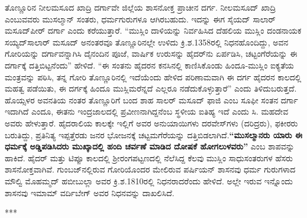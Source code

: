 \vskip -2pt

ತೊಣ್ಣೂರಿನ ನೀಲಮಸೂದ ಖಾದ್ರಿ ದರ್ಗಾವೇ ಜಿಲ್ಲೆಯ ಶಾಸನೋಕ್ತ ಪ್ರಾಚೀನ ದರ್ಗ. ನೀಲಮಸೂದ್​ ಖಾದ್ರಿ ಎಂಬುವವರು ಮುಸಲ್ಮಾನ್​ ಸಂತರು, ಧರ್ಮಗುರುಗಳೂ ಆಗಿರಬಹುದು. ಇದನ್ನು ಈಗ ಸೈಯದ್​ ಸಾಲಾರ್​ ಮಸೂದ್​ ಪೀರ್​ ದರ್ಗಾ ಎಂದು ಕರೆಯುತ್ತಾರೆ. “ಮುಸ್ಲಿಂ ದಾಳಿಯನ್ನು ನಿರ್ವಹಿಸಿದ ದೆಹಲಿಯ ಮುಸ್ಲಿಂ ದಂಡನಾಯಕ ಸಯ್ಯದ್​ ಸಾಲಾರ್​ ಮಸೂದ್​ ಅನಂತರವೂ ತೊಣ್ಣೂರಿನಲ್ಲೇ ಉಳಿದು ಕ್ರಿ.ಶ.1358ರಲ್ಲಿ ನಿಧನಹೊಂದಿದ್ದು, ಅವನ ಗೋರಿಯನ್ನು ದರ್ಗಾವನ್ನಾಗಿಸಿ ದೈನಂದಿನ ಪೂಜೆ, ವಾರ್ಷಿಕ ಉರುಸನ್ನು ಹೈದರ್​ನು ಏರ್ಪಡಿಸಿ, ಚಟ್ಟಂಗೆರೆಯನ್ನು ಈ ದರ್ಗಾಕ್ಕೆ ದತ್ತಿಬಿಟ್ಟನೆಂದು” ಹೇಳಿದೆ. “ಈ ಸಂತನು ಹೈದರನ ಕನಸಿನಲ್ಲಿ ಕಾಣಿಸಿಕೊಂಡು ಹಿಂದೂ-ಮುಸ್ಲಿಂ ಐಕ್ಯತೆಯ ಮಂತ್ರವನ್ನು ಪಠಿಸಿ, ತನ್ನ ಗೋರಿ ತೊಣ್ಣೂರಿನಲ್ಲಿ ಇದೆಯೆಂದು ಹೇಳಿದ ಪರಿಣಾಮವಾಗಿ ಈ ದರ್ಗ ಹೈದರನ ಕಾಲದಲ್ಲಿ ಮಹತ್ವ ಪಡೆಯಿತು, ಈ ದರ್ಗಕ್ಕೆ ಹಿಂದೂ ಮುಸ್ಲಿಮರೆನ್ನದೆ ಎಲ್ಲರೂ ನಡೆದುಕೊಳ್ಳುತ್ತಾರೆ” ಎಂದು ತಿಳಿದುಬರುತ್ತದೆ. ಹೊಯ್ಸಳರ ಅವನತಿಯ ನಂತರ ತೊಣ್ಣೂರಿಗೆ ಬಂದ ಶಾಹ ಸಾಲರ್ ಮಸೂದ್ ಫಾಜಿ ಎಂಬ ಸೂಫೀ ಸಂತನ ದರ್ಗಾ ಇದಾಗಿದೆ ಎಂದೂ, ಈತನು ಇಂದ್ರಜಾಲದಲ್ಲಿ ಪ್ರವೀಣ\-ನಾಗಿದ್ದನೆಂಬ ಸ್ಥಳೀಯ ಐತಿಹ್ಯ ಇದೆ ಎಂದು ಸಿ. ಮಹದೇವ ಅವರು ಹೇಳುತ್ತಾರೆ. ಹೈದರಾಲಿಯ ಕಾಲಕ್ಕೇ ಇಲ್ಲಿಗೆ ಅವರ ಅನುಯಾಯಿಗಳು ದರವೇಸ್​ಗಳು (ದರಿದ್ರರು), ಫಕೀರರು ಬರುತಿದ್ದು, ಪ್ರತಿನಿತ್ಯ ಇಪ್ಪತ್ತೆರಡು ಜನರ ಭೋಜನಕ್ಕೆ ಚಟ್ಟಮಗೆರೆಯನ್ನು ದತ್ತಿಬಿಡಲಾಗಿದೆ.\textbf{“ಮುಸಲ್ಮಾನರು ಯಾರು ಈ ಧರ್ಮಕ್ಕೆ ಅಡ್ಡಿಪಡಿಸಿದರು ಮುಖ್ಕಾದಲ್ಲಿ ಹಂದಿ ಚರ್ವಣೆ ಮಾಡಿದ ದೋಷಕೆ ಹೋಗಲುಳವರು”} ಎಂಬ ಶಾಪವನ್ನು ಹಾಕಿದೆ. ಹೈದರ್​ ಮತ್ತು ಟಿಪ್ಪೂ ಕಾಲದಲ್ಲಿ ಶ‍್ರೀರಂಗಪಟ್ಟಣದಲ್ಲಿ ನೆಲೆಸಿದ್ದ ಕೆಲವು ಮುಸ್ಲಿಂ ಸಾಧುಸಂತರುಗಳ ಹೆಸರು ಶಾಸನೋಕ್ತವಾಗಿವೆ. ಗುಂಬಜ್​ನಲ್ಲಿರುವ ಗೋರಿಯೊಂದರ ಮೇಲಿರುವ ಪರ್ಷಿಯನ್​ ಶಾಸನವು ಧರ್ಮ ಗುರುಗಳಾದ ಮೌಲ್ವಿ ಮೊಹಮ್ಮದ್​ ಹಬೀಬುಲ್ಲಾ ಅವರ ಕ್ರಿ.ಶ.1810ರಲ್ಲಿ ನಿಧನರಾದರೆಂದು ಹೇಳಿದೆ. ಅಲ್ಲೇ ಇರುವ ಇನ್ನೊಂದು ಶಾಸನವು ಇಮಾಮ್ ವರ್ದಿಬೇಗ್​ ಅವರ ನಿಧನವನ್ನು ದಾಖಲಿಸಿದೆ.

\begin{center}
***
\end{center}

\theendnotes

